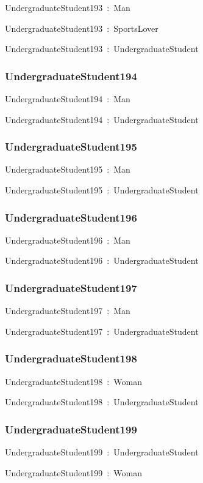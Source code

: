 \documentclass{article}
\begin{document}
UndergraduateStudent193~:~Man

UndergraduateStudent193~:~SportsLover

UndergraduateStudent193~:~UndergraduateStudent

\subsubsection*{UndergraduateStudent194}

UndergraduateStudent194~:~Man

UndergraduateStudent194~:~UndergraduateStudent

\subsubsection*{UndergraduateStudent195}

UndergraduateStudent195~:~Man

UndergraduateStudent195~:~UndergraduateStudent

\subsubsection*{UndergraduateStudent196}

UndergraduateStudent196~:~Man

UndergraduateStudent196~:~UndergraduateStudent

\subsubsection*{UndergraduateStudent197}

UndergraduateStudent197~:~Man

UndergraduateStudent197~:~UndergraduateStudent

\subsubsection*{UndergraduateStudent198}

UndergraduateStudent198~:~Woman

UndergraduateStudent198~:~UndergraduateStudent

\subsubsection*{UndergraduateStudent199}

UndergraduateStudent199~:~UndergraduateStudent

UndergraduateStudent199~:~Woman
\end{document}

